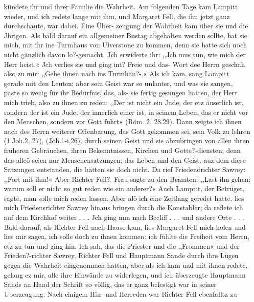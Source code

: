 kiindete ihr und ihrer Familie die Wahrheit. Am folgenden Tage
kam Lampitt wieder, und ich redete lange mit ihm, und Margaret
Fell, die ihn jetzt ganz durchschaute, war dabei. Eine Über-
zeugung der Wahrheit kam über sie und die Jhrigen. Als bald
darauf ein allgemeiner Bustag abgehalten werden sollte, bat sie
mich, mit ihr ine Turmhaus von Ulverstone zu kommen, denn
sie hatte sich noch nicht gänzlich davon lo?-gemacht. Jch erwiderte
ihr: ,,Jch mus tun, wie mich der Herr heist.« Jch verlies sie
und ging int? Freie und das- Wort dee Herrn geschah also zu
mir: ,,Gehe ihnen nach ins Turmhau?-.« Als ich kam, sang
Lampitt gerade mit den Leuten; aber sein Geist war so unlanter,
und was sie sangen, paste so wenig für ihr Bedürfnis, das, als-
sie fertig gesungen hatten, der Herr mich trieb, also zu ihnen zu
reden: ,,Der ist nicht ein Jude, der etz äuserlich ist, sondern der
ist ein Jude, der innerlich einer ist, in seinem Leben, das er nicht
vor den Menschen, sondern vor Gott führt« (Röm. 2, 28.29).
Dann zeigte ich ihnen nach des Herrn weiterer Offenbarung, das
Gott gekommen sei, sein Volk zu lehren (1.Joh.2, 27), (Joh.1-i,26).
durch seinen Geist und sie abzubringen von allen ihren früheren
Gebräuchen, ihren Bekenntnissen, Kirchen und Gotte?-diensten;
denn das alleö seien nur Menschensatzungen; das Leben und den
Geist, auz dem diese Satzungen entstanden, die hätten sie doch
nicht. Da rief Friedenörichter Sawrey: ,,Fort mit ihm!« Aber
Richter Fell?. Frau sagte zu den Beamten: ,,Last ihn gehen;
warum soll er nicht so gut reden wie ein anderer?« Auch Lampitt,
der Betrüger, sagte, man solle mich reden lassen. Aber alö ich eine
Zeitlang geredet hatte, lies mich Friedensrichter Sawrey hinaus
bringen durch die Konstabler; da redete ich auf dem Kirchhof
weiter . . . Jch ging nun nach Becliff . . . und andere Orte . . .
Bald darauf, als Richter Fell nach Hause kam, lies Margaret
Fell mich holen und lies mir sagen, ich solle doch zu ihnen
kommen; ich fühlte die Freiheit vom Herrn, etz zu tun und ging
hin. Ich sah, das die Priester und die ,,Frommen« und der
Frieden?-richter Sawrey, Richter Fell und Hauptmann Sande durch
ihre Lügen gegen die Wahrheit eingenommen hatten, aber als ich
kam und mit ihnen redete, gelang ez mir, alle ihre Einwände zu
widerlegen, und ich überzeugte Hauptmann Sands an Hand der
Schrift so völlig, das er ganz befestigt war in seiner Uberzeugung.
Nach einigem Hin- und Herreden war Richter Fell ebenfalltz zu-


